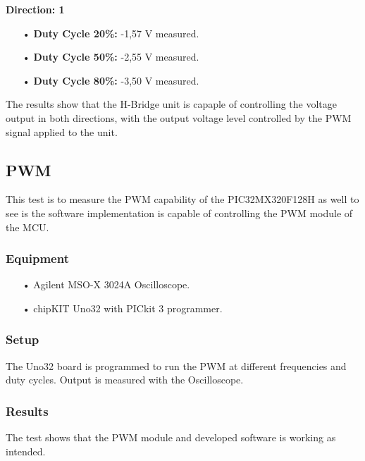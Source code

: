 \textbf{Direction: 1}
\begin{enumerate}
	\item[•]\textbf{Duty Cycle 20\%:} -1,57 V measured.
	\item[•]\textbf{Duty Cycle 50\%:} -2,55 V measured.
	\item[•]\textbf{Duty Cycle 80\%:} -3,50 V measured.
\end{enumerate}

The results show that the H-Bridge unit is capaple of controlling the voltage output in both directions, with the output voltage level controlled by the PWM signal applied to the unit.

\subsection{PWM}
This test is to measure the PWM capability of the PIC32MX320F128H as well to see is the software implementation is capable of controlling the PWM module of the MCU.

\subsubsection{Equipment}
\begin{enumerate}
	\item[•]Agilent MSO-X 3024A Oscilloscope.
	\item[•]chipKIT Uno32 with PICkit 3 programmer.
\end{enumerate}

\subsubsection{Setup}
The Uno32 board is programmed to run the PWM at different frequencies and duty cycles.
Output is measured with the Oscilloscope.

\subsubsection{Results}
The test shows that the PWM module and developed software is working as intended.
\newpage

